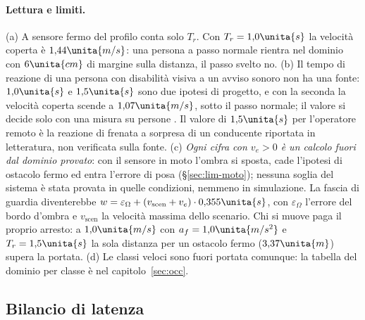 \paragraph{Lettura e limiti.} (a) A sensore fermo del profilo conta solo $T_r$. Con $T_r=1{,}0\unita{s}$ la velocità coperta è $1{,}44\unita{m/s}$: una persona a passo normale rientra nel dominio con $6\unita{cm}$ di margine sulla distanza, il passo svelto no. (b) Il tempo di reazione di una persona con disabilità visiva a un avviso sonoro non ha una fonte: $1{,}0\unita{s}$ e $1{,}5\unita{s}$ sono due ipotesi di progetto, e con la seconda la velocità coperta scende a $1{,}07\unita{m/s}$, sotto il passo normale; il valore si decide solo con una misura su persone . Il valore di $1{,}5\unita{s}$ per l'operatore remoto è la reazione di frenata a sorpresa di un conducente riportata in letteratura, non verificata sulla fonte. (c) \emph{Ogni cifra con $v_e>0$ è un calcolo fuori dal dominio provato}: con il sensore in moto l'ombra si sposta, cade l'ipotesi di ostacolo fermo ed entra l'errore di posa (\S\ref{sec:lim-moto}); nessuna soglia del sistema è stata provata in quelle condizioni, nemmeno in simulazione. La fascia di guardia diventerebbe $w=\varepsilon_\Omega+(v_{\mathrm{scen}}+v_e)\cdot0{,}355\unita{s}$, con $\varepsilon_\Omega$ l'errore del bordo d'ombra e $v_{\mathrm{scen}}$ la velocità massima dello scenario. Chi si muove paga il proprio arresto: a $1{,}0\unita{m/s}$ con $a_f=1{,}0\unita{m/s^2}$ e $T_r=1{,}5\unita{s}$ la sola distanza per un ostacolo fermo ($3{,}37\unita{m}$) supera la portata. (d) Le classi veloci sono fuori portata comunque: la tabella del dominio per classe è nel capitolo~\ref{sec:occ}.

\subsection{Bilancio di latenza}\label{sec:lim-latenza}

